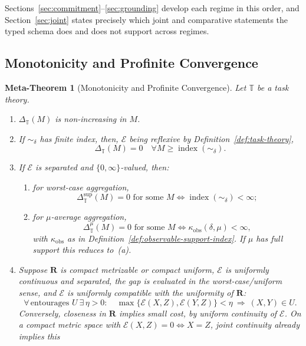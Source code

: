 \documentclass[12pt]{article}
\newtheorem{metatheorem}[theorem]{Meta-Theorem}
\theoremstyle{definition}
\begin{document}
Sections~\ref{sec:commitment}--\ref{sec:grounding} develop each regime in
this order, and Section~\ref{sec:joint} states precisely which joint and
comparative statements the typed schema does and does not support across
regimes.

\subsection{Monotonicity and Profinite Convergence}
\label{subsec:meta-monotone}

\begin{metatheorem}[Monotonicity and Profinite Convergence]
\label{meta:monotone}
Let $\mathbb T$ be a task theory.
\begin{enumerate}[label=(\roman*)]
\item $\Delta_{\mathbb T}(M)$ is non-increasing in $M$.
\item If $\sim_\delta$ has finite index, then, $\mathcal E$ being reflexive by
Definition~\ref{def:task-theory},
\[
\Delta_{\mathbb T}(M)=0
\quad
\forall M\ge\operatorname{index}(\sim_\delta).
\]
\item If $\mathcal E$ is separated and $\{0,\infty\}$-valued, then:
\begin{enumerate}[label=(\alph*)]
\item for worst-case aggregation,
\[
\Delta_{\mathbb T}^{\sup}(M)=0
\text{ for some }M
\iff
\operatorname{index}(\sim_\delta)<\infty;
\]
\item for $\mu$-average aggregation,
\[
\Delta_{\mathbb T}^{\mu}(M)=0
\text{ for some }M
\iff
\kappa_{\mathrm{obs}}(\delta,\mu)<\infty,
\]
with $\kappa_{\mathrm{obs}}$ as in
Definition~\ref{def:observable-support-index}.  If $\mu$ has full support this
reduces to~(a).
\end{enumerate}
\item Suppose $\mathbf R$ is compact metrizable or compact uniform,
$\mathcal E$ is uniformly continuous and separated, the gap is evaluated in
the worst-case/uniform sense, and $\mathcal E$ is \emph{uniformly compatible}
with the uniformity of $\mathbf R$:
\[
\forall\,\text{entourages }U\ \exists\,\eta>0:\quad
\max\{\mathcal E(X,Z),\mathcal E(Y,Z)\}<\eta
\ \Longrightarrow\ (X,Y)\in U .
\]
Conversely, closeness in $\mathbf R$ implies small cost, by uniform continuity
of $\mathcal E$.  On a compact metric space with
$\mathcal E(X,Z)=0\iff X=Z$, joint continuity already implies this

\end{enumerate}
\end{metatheorem}
\end{document}
